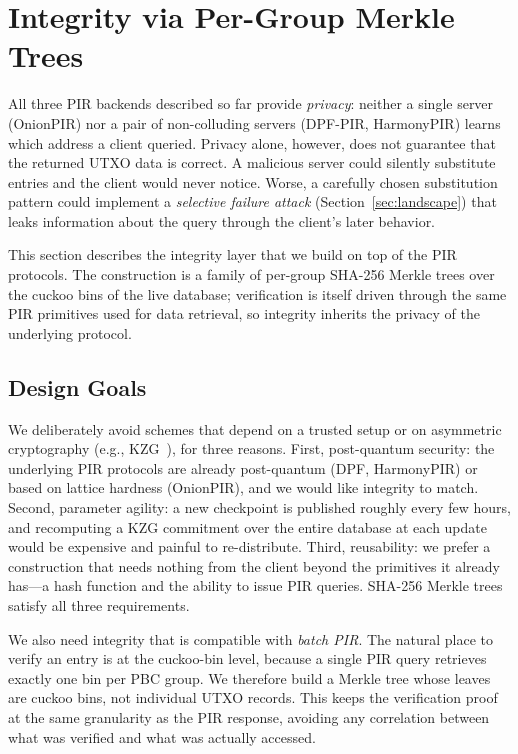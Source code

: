 \section{Integrity via Per-Group Merkle Trees}
\label{sec:merkle}

All three PIR backends described so far provide \emph{privacy}: neither a single server (OnionPIR) nor a pair of non-colluding servers (DPF-PIR, HarmonyPIR) learns which address a client queried. Privacy alone, however, does not guarantee that the returned UTXO data is correct. A malicious server could silently substitute entries and the client would never notice. Worse, a carefully chosen substitution pattern could implement a \emph{selective failure attack} (Section~\ref{sec:landscape}) that leaks information about the query through the client's later behavior.

This section describes the integrity layer that we build on top of the PIR protocols. The construction is a family of per-group SHA-256 Merkle trees over the cuckoo bins of the live database; verification is itself driven through the same PIR primitives used for data retrieval, so integrity inherits the privacy of the underlying protocol.

\subsection{Design Goals}

We deliberately avoid schemes that depend on a trusted setup or on asymmetric cryptography (e.g., KZG~\cite{kzg10}), for three reasons. First, post-quantum security: the underlying PIR protocols are already post-quantum (DPF, HarmonyPIR) or based on lattice hardness (OnionPIR), and we would like integrity to match. Second, parameter agility: a new checkpoint is published roughly every few hours, and recomputing a KZG commitment over the entire database at each update would be expensive and painful to re-distribute. Third, reusability: we prefer a construction that needs nothing from the client beyond the primitives it already has---a hash function and the ability to issue PIR queries. SHA-256 Merkle trees satisfy all three requirements.

We also need integrity that is compatible with \emph{batch PIR}. The natural place to verify an entry is at the cuckoo-bin level, because a single PIR query retrieves exactly one bin per PBC group. We therefore build a Merkle tree whose leaves are cuckoo bins, not individual UTXO records. This keeps the verification proof at the same granularity as the PIR response, avoiding any correlation between what was verified and what was actually accessed.

